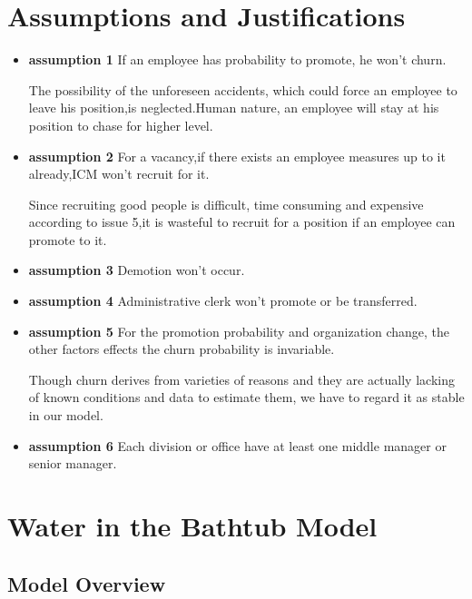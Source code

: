 \documentclass[12pt,a4paper,titlepage]{article}
\begin{document}
\section{Assumptions and Justifications}
\label{sec:assumptions-and-justifications}

\begin{itemize}
\item \textbf{assumption 1} If an employee has probability to
  promote, he won't churn.

The possibility of the unforeseen accidents, which could force an
employee to leave his position,is neglected.Human nature, an employee
will stay at his position to chase for higher level.

\item \textbf{assumption 2} For a vacancy,if there exists an
  employee measures up to it already,ICM won't recruit for it.

Since recruiting good people is difficult, time consuming and
expensive according to issue 5,it is wasteful to recruit for a
position if an employee can promote to it.

\item \textbf{assumption 3} Demotion won't occur.

\item \textbf{assumption 4} Administrative clerk won't promote or be
  transferred.

\item \textbf{assumption 5} For the promotion probability and
  organization change, the other factors effects the churn probability
  is invariable.

Though churn derives from varieties of reasons and they are actually
lacking of known conditions and data to estimate them, we have to
regard it as stable in our model.

\item \textbf{assumption 6} Each division or office have at least one
  middle manager or senior manager.

\end{itemize}

\section{Water in the Bathtub Model}
\label{sec:human-capital-model}


\subsection{Model Overview}
\label{sec:model-overview}
\end{document}
